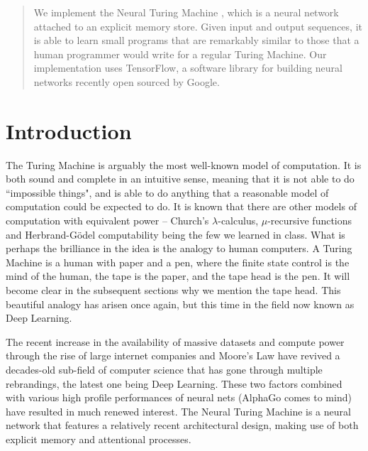\documentclass[12pt]{article}
\begin{document}
\maketitle

\begin{abstract}
We implement the Neural Turing Machine \cite{DBLP:journals/corr/GravesWD14},
which is a neural network attached to an explicit memory store.
Given input and output sequences, it is able to learn small programs
that are remarkably similar to those that a human programmer would
write for a regular Turing Machine. Our implementation uses
TensorFlow, a software library for building neural networks
recently open sourced by Google.

\end{abstract}

\section{Introduction}

The Turing Machine is arguably the most well-known model of computation.
It is both sound and complete in an intuitive sense, meaning that it
is not able to do ``impossible things", and is able to do anything
that a reasonable model of computation could be expected to do.
It is known that there are other models of computation with equivalent
power -- Church's $\lambda$-calculus, $\mu$-recursive functions and
Herbrand-G\"odel computability being the few we learned in class. What
is perhaps the brilliance in the idea is the analogy to human computers.
A Turing Machine is a human with paper and a pen, where the finite state
control is the mind of the human, the tape is the paper, and the tape head is
the pen. It will become clear in the subsequent sections why we
mention the tape head. This beautiful analogy has arisen once
again, but this time in the field now known as Deep Learning.

The recent increase in the availability of massive datasets and compute
power through the rise of large internet companies and Moore's Law have
revived a decades-old sub-field of computer science that has gone through
multiple rebrandings, the latest one being Deep Learning. These two
factors combined with various high profile performances of neural nets
(AlphaGo comes to mind) have resulted in much renewed interest. The
Neural Turing Machine is a neural network that features a relatively recent
architectural design, making use of both explicit memory and attentional processes.
\end{document}
